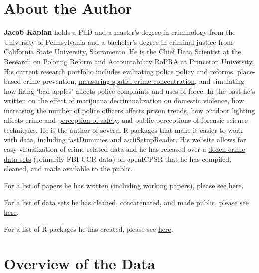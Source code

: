 \documentclass[
  12pt,
  openany]{book}
\begin{document}
\hypertarget{about-the-author}{%
\chapter*{About the Author}\label{about-the-author}}


\textbf{Jacob Kaplan} holds a PhD and a master's degree in criminology from the University of Pennsylvania and a bachelor's degree in criminal justice from California State University, Sacramento. He is the Chief Data Scientist at the Research on Policing Reform and Accountability \href{https://policingresearch.org/team/}{RoPRA} at Princeton University. His current research portfolio includes evaluating police policy and reforms, place-based crime prevention, \href{https://doi.org/10.1177/0022427820984213}{measuring spatial crime concentration}, and simulating how firing `bad apples' affects police complaints and uses of force.
In the past he's written on the effect of \href{https://doi.org/10.1177/0886260520961876}{marijuana decriminalization on domestic violence}, how \href{https://doi.org/10.1111/1745-9133.12424}{increasing the number of police officers affects prison trends}, how outdoor lighting affects crime and \href{https://link.springer.com/article/10.1057/s41284-021-00296-0}{perception of safety}, and public perceptions of forensic science techniques. He is the author of several R packages that make it easier to work with data, including \href{https://jacobkap.github.io/fastDummies/}{fastDummies} and \href{https://jacobkap.github.io/asciiSetupReader/}{asciiSetupReader}. His \href{http://jacobdkaplan.com/}{website} allows for easy visualization of crime-related data and he has released over a \href{http://jacobdkaplan.com/data.html}{dozen crime data sets} (primarily FBI UCR data) on openICPSR that he has compiled, cleaned, and made available to the public.

For a list of papers he has written (including working papers), please see \href{http://jacobdkaplan.com/research.html}{here}.

For a list of data sets he has cleaned, concatenated, and made public, please see \href{http://jacobdkaplan.com/data.html}{here}.

For a list of R packages he has created, please see \href{https://jacobdkaplan.com/packages.html}{here}.

\hypertarget{overview-of-the-data}{%
\chapter{Overview of the Data}\label{overview-of-the-data}}
\end{document}
